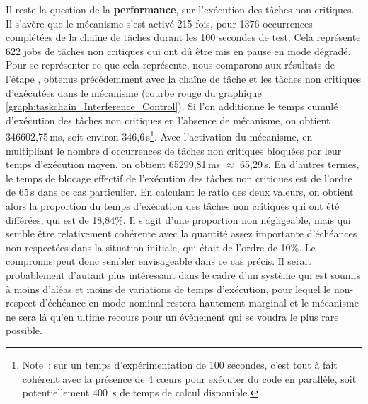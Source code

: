 \documentclass[french, a4paper, 11pt, twoside, pdftex]{StyleThese}
\begin{document}
Il reste la question de la \textbf{performance}, sur l'exécution des tâches non critiques. Il s'avère que le mécanisme s'est activé 215 fois, pour 1376 occurrences complétées de la chaîne de tâches durant les 100 secondes de test. Cela représente 622 jobs de tâches non critiques qui ont dû être mis en pause en mode dégradé.
Pour se représenter ce que cela représente, nous comparons aux résultats de l'étape , obtenus précédemment avec la chaîne de tâche et les tâches non critiques d'exécutées dans le mécanisme (courbe rouge du graphique \ref{graph:taskchain_Interference_Control}). Si l'on additionne le temps cumulé d'exécution des tâches non critiques en l'absence de mécanisme, on obtient 346602,75\,ms, soit environ 346,6\,s\footnote{Note~: sur un temps d'expérimentation de 100 secondes, c'est tout à fait cohérent avec la présence de 4 cœurs pour exécuter du code en parallèle, soit potentiellement 400~s de temps de calcul disponible.}. Avec l'activation du mécanisme, en multipliant le nombre d’occurrences de tâches non critiques bloquées par leur temps d'exécution moyen, on obtient 65299,81\,ms $\approx$ 65,29\,s. En d'autres termes, le temps de blocage effectif de l'exécution des tâches non critiques est de l'ordre de 65\,s dans ce cas particulier. En calculant le ratio des deux valeurs, on obtient alors la proportion du temps d'exécution des tâches non critiques qui ont été différées, qui est de 18,84\%. Il s'agit d'une proportion non négligeable, mais qui semble être relativement cohérente avec la quantité assez importante d'échéances non respectées dans la situation initiale, qui était de l'ordre de 10\%. Le compromis peut donc sembler envisageable dans ce cas précis. Il serait probablement d'autant plus intéressant dans le cadre d'un système qui est soumis à moins d'aléas et moins de variations de temps d'exécution, pour lequel le non-respect d'échéance en mode nominal restera hautement marginal et le mécanisme ne sera là qu'en ultime recours pour un évènement qui se voudra le plus rare possible.
\end{document}
